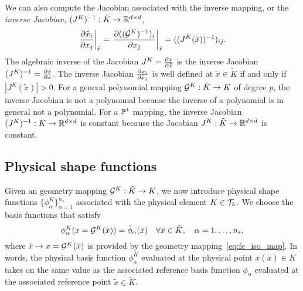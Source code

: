 We can also compute the Jacobian associated with the inverse mapping, or the \emph{inverse Jacobian}, $(J^K)^{-1}: \tilde K \to \mathbb{R}^{d \times d}$,
\begin{equation*}
  \left. \frac{\partial \tilde x_i}{\partial x_j} \right|_{\tilde x}
  = \left. \frac{\partial (( \mathcal{G}^K)^{-1})_i}{\partial x_j} \right|_{\tilde x}
  = ((J^K(\tilde x))^{-1})_{ij}.
\end{equation*}
The algebraic inverse of the Jacobian $J^K = \frac{\partial x}{\partial \tilde x}$ is the inverse Jacobian $(J^K)^{-1} = \frac{\partial \tilde x}{\partial x}$. The inverse Jacobian $\frac{\partial x_i}{\partial \tilde x_j}$ is well defined at $\tilde x \in \tilde K$ if and only if $|J^K(\tilde x)| > 0$. For a general polynomial mapping $\mathcal{G}^K: \tilde K \to K$ of degree $p$, the inverse Jacobian is not a polynomial because the inverse of a polynomial is in general not a polynomial.  For a $\mathbb{P}^1$ mapping, the inverse Jacobian $(J^K)^{-1}: K \to \mathbb{R}^{d \times d}$ is constant because the Jacobian $J^K: \tilde K \to \mathbb{R}^{d \times d}$ is constant.

\subsection{Physical shape functions}
  \label{sec:fe_phy_shape}
Given an geometry mapping $\mathcal{G}^K : \tilde K \to K$, we now introduce physical shape functions $\{ \phi^K_\alpha \}_{\alpha=1}^{n_s}$ associated with the physical element $K \in \mathcal{T}_h$.  We choose the basis functions that satisfy
\begin{equation}
  \phi^K_\alpha(x = \mathcal{G}^K(\tilde x)) = \tilde \phi_\alpha(\tilde x) \quad \forall \tilde x \in \tilde K, \quad \alpha =  1, \dots, n_s,
  \label{eq:fe_impl_phiK}
\end{equation}
where $\tilde x \mapsto x = \mathcal{G}^K(\tilde x)$ is provided by the geometry mapping~\eqref{eq:fe_iso_map}. In words, the physical basis function $\phi^K_\alpha$ evaluated at the physical point $x(\tilde x) \in K$ takes on the same value as the associated reference basis function $\phi_\alpha$ evaluated at the associated reference point $\tilde x \in \tilde K$.

